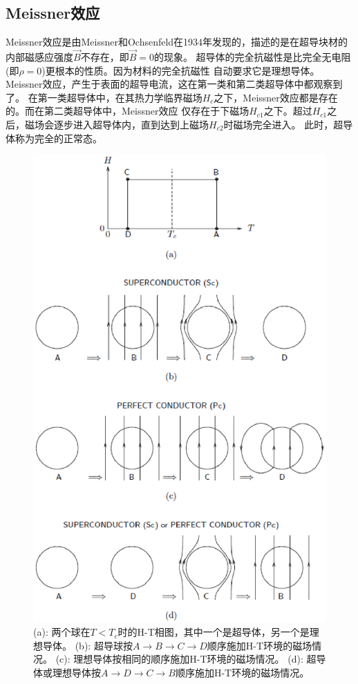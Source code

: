 \subsection{Meissner效应}
Meissner效应是由Meissner和Ochsenfeld在1934年发现的，描述的是在超导块材的内部磁感应强度$\vec{B}$不存在，即$\vec{B}=0$的现象。
超导体的完全抗磁性是比完全无电阻(即$\rho=0$)更根本的性质。因为材料的完全抗磁性
自动要求它是理想导体。Meissner效应，产生于表面的超导电流，这在第一类和第二类超导体中都观察到了。
在第一类超导体中，在其热力学临界磁场$H_c$之下，Meissner效应都是存在的。而在第二类超导体中，Meissner效应
仅存在于下磁场$H_{c1}$之下。超过$H_{c1}$之后，磁场会逐步进入超导体内，直到达到上磁场$H_{c2}$时磁场完全进入。
此时，超导体称为完全的正常态。
\begin{figure}
  \centering
 \includegraphics[scale=0.7]{chpt1/figs/fig1.1.eps}
  \caption{
(a): 两个球在$T <T_c$时的H-T相图，其中一个是超导体，另一个是理想导体。
(b): 超导球按$ A\rightarrow B\rightarrow C\rightarrow D$顺序施加H-T环境的磁场情况。
(c): 理想导体按相同的顺序施加H-T环境的磁场情况。
(d): 超导体或理想导体按$A\rightarrow D\rightarrow C\rightarrow B$顺序施加H-T环境的磁场情况。}
\end{figure}

